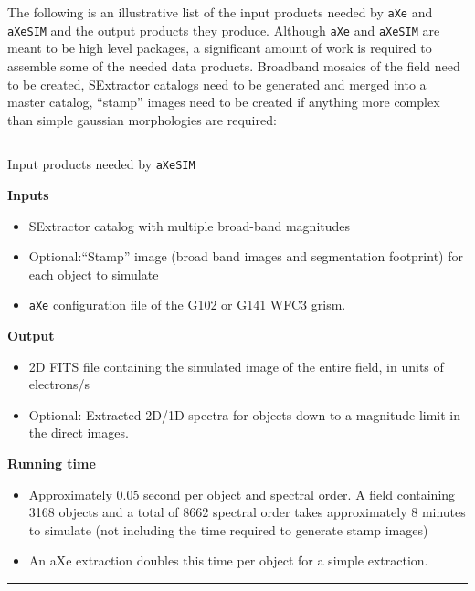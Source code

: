 \documentclass[preprint]{aastex}
\begin{document}
The following is an illustrative list of the input products needed by \texttt{aXe} and \texttt{aXeSIM} and the output products they produce. Although \texttt{aXe} and \texttt{aXeSIM} are meant to be high level packages, a significant amount of work is required to assemble some of the needed data products. Broadband mosaics of the field need to be created, SExtractor catalogs need to be generated and merged into a master catalog, ``stamp'' images need to be created if anything more complex than simple gaussian morphologies are required:

\noindent\hfil\rule{0.5\textwidth}{.4pt}\hfil

\centerline{Input products needed by \texttt{aXeSIM}}
\noindent \textbf{Inputs}
\begin{itemize}
\item SExtractor catalog with multiple broad-band magnitudes
\item Optional:``Stamp'' image (broad band images and segmentation footprint) for each object to simulate 
\item \texttt{aXe} configuration file of the G102 or G141 WFC3 grism.
\end{itemize}
\noindent \textbf{Output}
\begin{itemize}
\item 2D FITS file containing the simulated image of the entire field, in units of electrons/s 
\item Optional: Extracted 2D/1D spectra for objects down to a magnitude limit in the direct images.
\end{itemize}

\noindent \textbf{Running time}
\begin{itemize}
\item Approximately 0.05 second per object and spectral order. A field containing 3168 objects and a total of 8662 spectral order takes approximately 8 minutes to simulate (not including the time required to generate stamp images)
\item An aXe extraction doubles this time per object for a simple extraction.
\end{itemize}

\noindent\hfil\rule{0.5\textwidth}{.4pt}\hfil
\end{document}
